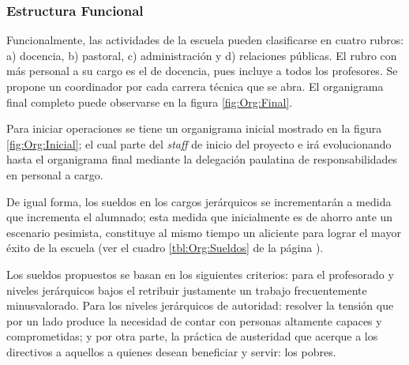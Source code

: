 \subsubsection{Estructura Funcional}

Funcionalmente, las actividades de la escuela pueden clasificarse en cuatro rubros: a) docencia, b) pastoral, c) administración y d) relaciones públicas. El rubro con más personal a su cargo es el de docencia, pues incluye a todos los profesores. Se propone un coordinador por cada carrera técnica que se abra. El organigrama final completo puede observarse en la figura \ref{fig:Org:Final}.


Para iniciar operaciones se tiene un organigrama inicial mostrado en la figura \ref{fig:Org:Inicial}; el cual parte del \emph{staff} de inicio del proyecto e irá evolucionando hasta el organigrama final mediante la delegación paulatina de responsabilidades en personal a cargo.

De igual forma, los sueldos en los cargos jerárquicos se incrementarán a medida que incrementa el alumnado; esta medida que inicialmente es de ahorro ante un escenario pesimista, constituye al mismo tiempo un aliciente para lograr el mayor éxito de la escuela (ver el cuadro \ref{tbl:Org:Sueldos} de la página \pageref{tbl:Org:Sueldos}).

Los sueldos propuestos se basan en los siguientes criterios: para el profesorado y niveles jerárquicos bajos el retribuir justamente un trabajo frecuentemente minusvalorado. Para los niveles jerárquicos de autoridad: resolver la tensión que por un lado produce la necesidad de contar con personas altamente capaces y comprometidas; y por otra parte, la práctica de austeridad que acerque a los directivos a aquellos a quienes desean beneficiar y servir: los pobres.

